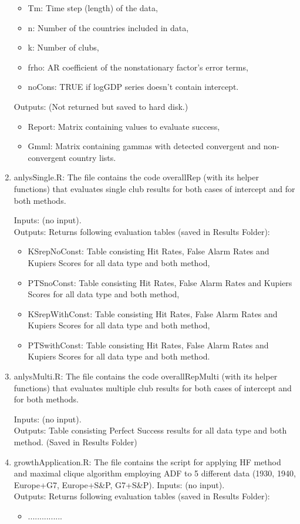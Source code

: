 \documentclass{article}
\begin{document}
\begin{enumerate}
\begin{itemize}
		\item Tm: Time step (length) of the data,
		\item n: Number of the countries included in data,
		\item k: Number of clubs, 
		\item frho: AR coefficient of the nonstationary factor's error terms,
		\item noCons: TRUE if logGDP series doesn't contain intercept.
	\end{itemize}
	
	Outputs: (Not returned but saved to hard disk.)
	
	\begin{itemize}
		\item Report: Matrix containing values to evaluate success,
		\item Gmml: Matrix containing gammas with detected convergent and non-convergent country lists.
	\end{itemize}		 	
	
	\item anlysSingle.R: The file contains the code overallRep (with its helper functions) that evaluates single club results for both cases of intercept and for both methods.
	
	Inputs: (no input).\\
	Outputs: Returns following evaluation tables (saved in Results Folder):
	\begin{itemize}
		\item KSrepNoConst: Table consisting Hit Rates, False Alarm Rates and Kupiers Scores for all data type and both method,
		\item PTSnoConst: Table consisting Hit Rates, False Alarm Rates and Kupiers Scores for all data type and both method,
		\item KSrepWithConst: Table consisting Hit Rates, False Alarm Rates and Kupiers Scores for all data type and both method,
		\item PTSwithConst: Table consisting Hit Rates, False Alarm Rates and Kupiers Scores for all data type and both method.
		
	\end{itemize}
	
	\item anlysMulti.R: The file contains the code overallRepMulti (with its helper functions) that evaluates multiple club results for both cases of intercept and for both methods.
	
	Inputs: (no input).\\
	Outputs: Table consisting Perfect Success results for all data type and both method. (Saved in Results Folder)
	\item growthApplication.R: The file contains the script for applying HF method and maximal clique algorithm employing ADF to 5 different data (1930, 1940, Europe+G7, Europe+S\&P, G7+S\&P). 
	Inputs: (no input).\\
	Outputs: Returns following evaluation tables (saved in Results Folder):
	\begin{itemize}
		\item  ...............
	\end{itemize}

\end{enumerate}
\end{document}
